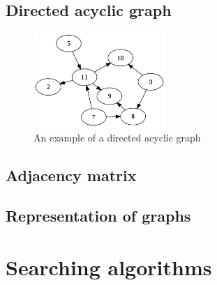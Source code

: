 \documentclass[a4paper, 10pt]{article}
\begin{document}
\subsection{Directed acyclic graph}

\begin{figure}[hbt]
    \begin{center}
        \includegraphics[width=5cm] {img/dag.png}
	\caption{An example of a directed acyclic graph}
    \end{center}
\end{figure}


\subsection{Adjacency matrix}
\subsection{Representation of graphs}




\section{Searching algorithms}
\end{document}
